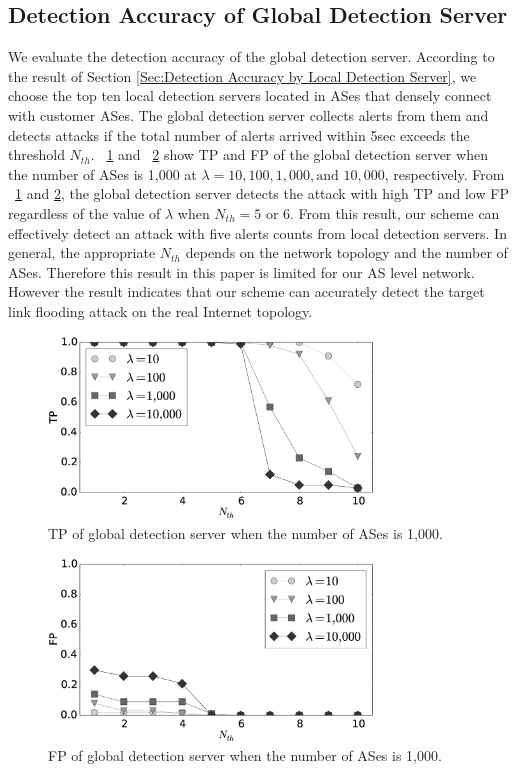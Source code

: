 \documentclass[conference]{IEEEtran}
\begin{document}
  \subsection{Detection Accuracy of Global Detection Server}\label{Sec:Detection Accuracy of Global Detection Server}
    We evaluate the detection accuracy of the global detection server.
    According to the result of Section \ref{Sec:Detection Accuracy by Local Detection Server}, we choose the top ten local detection servers located in ASes that densely connect with customer ASes.
    The global detection server collects alerts from them and detects attacks if the total number of alerts arrived within 5sec exceeds the threshold $N_{th}$.
    \figurename~\ref{fig:TP of global detection server} and \figurename~\ref{fig:FP of global detection server} show TP and FP of the global detection server when the number of ASes is 1,000 at $\lambda = 10, 100, 1,000, \text{and } 10,000$, respectively.
    From \figurename~\ref{fig:TP of global detection server} and \ref{fig:FP of global detection server}, the global detection server detects the attack with high TP and low FP regardless of the value of $\lambda$ when $N_{th}=5$ or 6.
    From this result, our scheme can effectively detect an attack with five alerts counts from local detection servers.
    In general, the appropriate $N_{th}$ depends on the network topology and the number of ASes.
    Therefore this result in this paper is limited for our AS level network.
    However the result indicates that our scheme can accurately detect the target link flooding attack on the real Internet topology.
    \begin{figure}[!t]
      \centering
      \includegraphics[clip, width=3.4in]{./image/globalTPFP/globalTP_node1000.eps}
      \caption{TP of global detection server when the number of ASes is 1,000.}
      \label{fig:TP of global detection server}
    \end{figure}
    \begin{figure}[!t]
      \centering
      \includegraphics[clip, width=3.4in]{./image/globalTPFP/globalFP_node1000.eps}
      \caption{FP of global detection server when the number of ASes is 1,000.}
      \label{fig:FP of global detection server}
    \end{figure}
\end{document}
